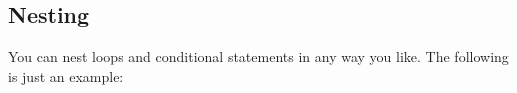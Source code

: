 \documentclass[11pt]{cselabheader}
\begin{document}
%
%
%
%
%
%
%
%
%
%
%
%
%
%
%

\subsection{Nesting}

You can nest loops and conditional statements in any way you
like. The following is just an example:
\end{document}
